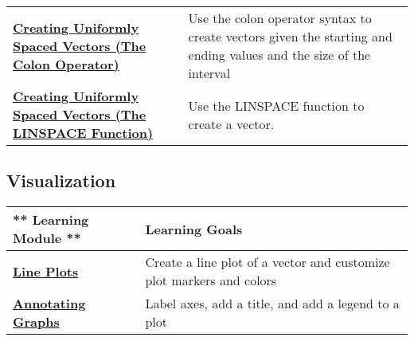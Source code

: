 \documentclass[11pt]{article}
\begin{document}
\begin{longtable}[]{@{}ll@{}}
\begin{minipage}[t]{0.29\columnwidth}
\textbf{\href{http://youtu.be/L7cERR5J9XY}{Creating Uniformly Spaced
Vectors (The Colon Operator)}}\strut
\end{minipage} & \begin{minipage}[t]{0.29\columnwidth}\raggedright\strut
Use the colon operator syntax to create vectors given the starting and
ending values and the size of the interval\strut
\end{minipage}\tabularnewline
\begin{minipage}[t]{0.29\columnwidth}\raggedright\strut
\textbf{\href{http://youtu.be/3QM3LRnb4Tw}{Creating Uniformly Spaced
Vectors (The LINSPACE Function)}}\strut
\end{minipage} & \begin{minipage}[t]{0.29\columnwidth}\raggedright\strut
Use the LINSPACE function to create a vector.\strut
\end{minipage}\tabularnewline
\bottomrule
\end{longtable}

\subsection{Visualization}\label{visualization}

\begin{longtable}[]{@{}ll@{}}
\toprule
\begin{minipage}[b]{0.29\columnwidth}\raggedright\strut
** Learning Module **\strut
\end{minipage} & \begin{minipage}[b]{0.29\columnwidth}\raggedright\strut
\textbf{Learning Goals}\strut
\end{minipage}\tabularnewline
\midrule
\endhead
\begin{minipage}[t]{0.29\columnwidth}\raggedright\strut
\textbf{\href{http://youtu.be/00k9A9W0cl8}{Line Plots}}\strut
\end{minipage} & \begin{minipage}[t]{0.29\columnwidth}\raggedright\strut
Create a line plot of a vector and customize plot markers and
colors\strut
\end{minipage}\tabularnewline
\begin{minipage}[t]{0.29\columnwidth}\raggedright\strut
\textbf{\href{http://youtu.be/ab3XIDdloNI}{Annotating Graphs}}\strut
\end{minipage} & \begin{minipage}[t]{0.29\columnwidth}\raggedright\strut
Label axes, add a title, and add a legend to a plot\strut
\end{minipage}\tabularnewline
\bottomrule
\end{longtable}
\end{document}
